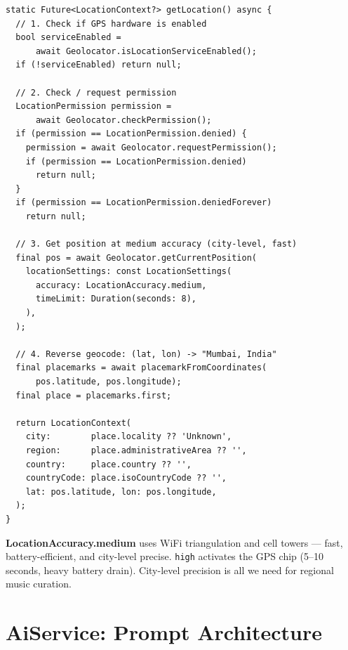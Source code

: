 \documentclass[12pt, a4paper]{report}
\begin{document}
\begin{tcolorbox}[cyanbox, title=lib/services/location\_service.dart]
\begin{lstlisting}[style=dartcode]
static Future<LocationContext?> getLocation() async {
  // 1. Check if GPS hardware is enabled
  bool serviceEnabled =
      await Geolocator.isLocationServiceEnabled();
  if (!serviceEnabled) return null;

  // 2. Check / request permission
  LocationPermission permission =
      await Geolocator.checkPermission();
  if (permission == LocationPermission.denied) {
    permission = await Geolocator.requestPermission();
    if (permission == LocationPermission.denied)
      return null;
  }
  if (permission == LocationPermission.deniedForever)
    return null;

  // 3. Get position at medium accuracy (city-level, fast)
  final pos = await Geolocator.getCurrentPosition(
    locationSettings: const LocationSettings(
      accuracy: LocationAccuracy.medium,
      timeLimit: Duration(seconds: 8),
    ),
  );

  // 4. Reverse geocode: (lat, lon) -> "Mumbai, India"
  final placemarks = await placemarkFromCoordinates(
      pos.latitude, pos.longitude);
  final place = placemarks.first;

  return LocationContext(
    city:        place.locality ?? 'Unknown',
    region:      place.administrativeArea ?? '',
    country:     place.country ?? '',
    countryCode: place.isoCountryCode ?? '',
    lat: pos.latitude, lon: pos.longitude,
  );
}
\end{lstlisting}
\end{tcolorbox}

\begin{tcolorbox}[notebox]
\textbf{\color{solarcolor}LocationAccuracy.medium} uses WiFi triangulation
and cell towers --- fast, battery-efficient, and city-level precise.
\texttt{high} activates the GPS chip (5--10 seconds, heavy battery drain).
City-level precision is all we need for regional music curation.
\end{tcolorbox}

\section{AiService: Prompt Architecture}
\end{document}

